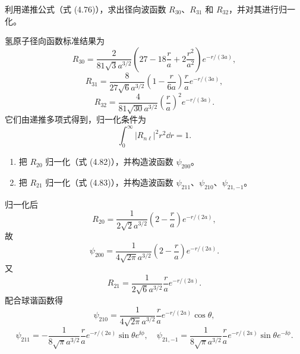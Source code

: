 \begin{question}
利用递推公式（式 (4.76)），求出径向波函数 $R_{30}$、$R_{31}$ 和 $R_{32}$，并对其进行归一化。

\par\smallskip
{}

\end{question}
\begin{solution}

氢原子径向函数标准结果为
\[
R_{30}=\frac{2}{81\sqrt3a^{3/2}}\left(27-18\frac{r}{a}+2\frac{r^2}{a^2}\right)e^{-r/(3a)},
\]
\[
R_{31}=\frac{8}{27\sqrt6a^{3/2}}\left(1-\frac{r}{6a}\right)\frac{r}{a}e^{-r/(3a)},
\]
\[
R_{32}=\frac{4}{81\sqrt{30}a^{3/2}}\left(\frac{r}{a}\right)^2e^{-r/(3a)}.
\]
它们由递推多项式得到，归一化条件为
\[
\int_0^\infty |R_{n\ell}|^2r^2\dd r=1.
\]

\end{solution}

\begin{question}
\begin{enumerate}
\item 把 $R_{20}$ 归一化（式 (4.82)），并构造波函数 $\psi_{200}$。
\item 把 $R_{21}$ 归一化（式 (4.83)），并构造波函数 $\psi_{211}$、$\psi_{210}$、$\psi_{21,-1}$。
\end{enumerate}

\par\smallskip
{}

\end{question}
\begin{solution}

归一化后
\[
R_{20}=\frac{1}{2\sqrt2a^{3/2}}\left(2-\frac{r}{a}\right)e^{-r/(2a)},
\]
故
\[
\psi_{200}=\frac{1}{4\sqrt{2\pi}a^{3/2}}\left(2-\frac{r}{a}\right)e^{-r/(2a)}.
\]
又
\[
R_{21}=\frac{1}{2\sqrt6a^{3/2}}\frac{r}{a}e^{-r/(2a)}.
\]
配合球谐函数得
\[
\psi_{210}=\frac{1}{4\sqrt{2\pi}a^{3/2}}\frac{r}{a}e^{-r/(2a)}\cos\theta,
\]
\[
\psi_{211}=-\frac{1}{8\sqrt\pi a^{3/2}}\frac{r}{a}e^{-r/(2a)}\sin\theta e^{\ii\phi},
\quad
\psi_{21,-1}=\frac{1}{8\sqrt\pi a^{3/2}}\frac{r}{a}e^{-r/(2a)}\sin\theta e^{-\ii\phi}.
\]

\end{solution}

